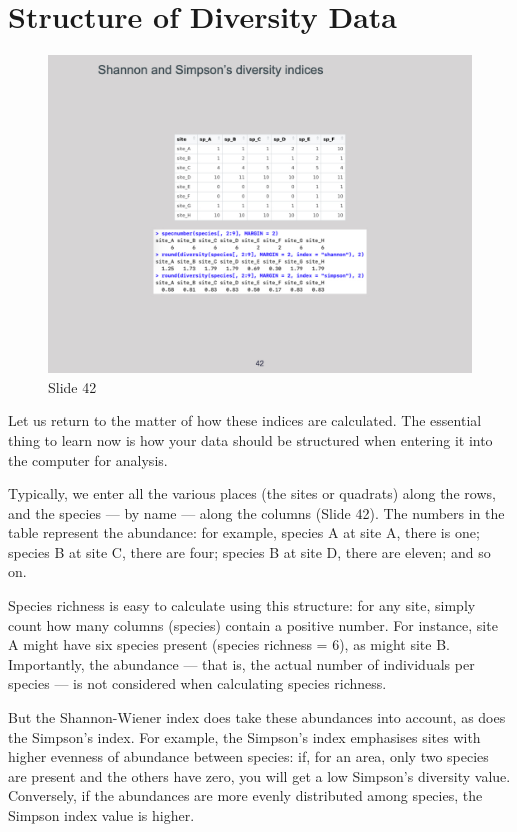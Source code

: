 \documentclass[
  11pt,
]{book}
\begin{document}
\section{Structure of Diversity Data}\label{structure-of-diversity-data}

\begin{figure}[ht]
\centering
\includegraphics[width=0.8\linewidth]{../images/BDC334/BDC334-042.jpeg}
\caption*{Slide 42}
\end{figure}

Let us return to the matter of how these indices are calculated. The
essential thing to learn now is how your data should be structured when
entering it into the computer for analysis.

Typically, we enter all the various places (the sites or quadrats) along
the rows, and the species --- by name --- along the columns (Slide 42).
The numbers in the table represent the abundance: for example, species A
at site A, there is one; species B at site C, there are four; species B
at site D, there are eleven; and so on.

Species richness is easy to calculate using this structure: for any
site, simply count how many columns (species) contain a positive number.
For instance, site A might have six species present (species richness =
\(6\)), as might site B. Importantly, the abundance --- that is, the
actual number of individuals per species --- is not considered when
calculating species richness.

But the Shannon-Wiener index does take these abundances into account, as
does the Simpson's index. For example, the Simpson's index emphasises
sites with higher evenness of abundance between species: if, for an
area, only two species are present and the others have zero, you will
get a low Simpson's diversity value. Conversely, if the abundances are
more evenly distributed among species, the Simpson index value is
higher.
\end{document}
